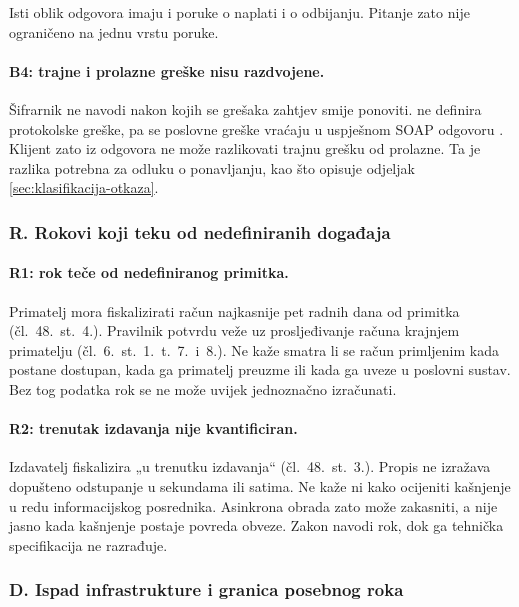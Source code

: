 Isti oblik odgovora imaju i poruke o naplati i o odbijanju. Pitanje zato
nije ograničeno na jednu vrstu poruke.

\paragraph{B4: trajne i prolazne greške nisu razdvojene.}
Šifrarnik ne navodi nakon kojih se grešaka zahtjev smije ponoviti.  ne
definira protokolske greške, pa se poslovne greške vraćaju u uspješnom SOAP
odgovoru \cite{pu2026tehspec}. Klijent zato iz odgovora ne može razlikovati
trajnu grešku od prolazne. Ta je razlika potrebna za odluku o ponavljanju,
kao što opisuje odjeljak \ref{sec:klasifikacija-otkaza}.

\subsubsection*{R. Rokovi koji teku od nedefiniranih događaja}

\paragraph{R1: rok teče od nedefiniranog primitka.}
Primatelj mora fiskalizirati račun najkasnije pet radnih dana od primitka
(čl.~48.~st.~4.). Pravilnik potvrdu veže uz prosljeđivanje računa krajnjem
primatelju (čl.~6.~st.~1.~t.~7.\ i~8.). Ne kaže smatra li se račun
primljenim kada postane dostupan, kada ga primatelj preuzme ili kada ga
uveze u poslovni sustav. Bez tog podatka rok se ne može uvijek jednoznačno
izračunati.

\paragraph{R2: trenutak izdavanja nije kvantificiran.}
Izdavatelj fiskalizira „u trenutku izdavanja“ (čl.~48.~st.~3.). Propis ne
izražava dopušteno odstupanje u sekundama ili satima. Ne kaže ni kako
ocijeniti kašnjenje u redu informacijskog posrednika. Asinkrona obrada zato
može zakasniti, a nije jasno kada kašnjenje postaje povreda obveze. Zakon
navodi rok, dok ga tehnička specifikacija ne razrađuje.

\subsubsection*{D. Ispad infrastrukture i granica posebnog roka}

